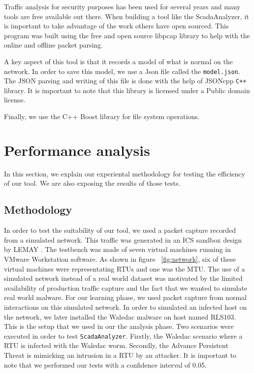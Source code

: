 \documentclass[12pt,journal,compsoc]{IEEEtran}
\begin{document}
\begin{empfile}
Traffic analysis for security purposes has been used for several years and many tools are free available out there. When building a tool like the ScadaAnalyzer, it is important to take advantage of the work others have open sourced. This program was built using the free and open source libpcap library to help with the online and offline packet parsing\cite{libpcap}. 

A key aspect of this tool is that it records a model of what is normal on the network. In order to save this model, we use a Json file called the \texttt{model.json}. The JSON parsing and writing of this file is done with the help of JSONcpp \verb!C++! library\cite{jsoncpp}. It is important to note that this library is licensed under a Public domain license.

Finally, we use the C++ Boost library for file system operations\cite{boost}.
\section{Performance analysis}
In this section, we explain our experiental methodology for testing the efficiency of our tool. We are also exposing the results of those tests.
\subsection{Methodology}
In order to test the suitability of our tool, we used a packet capture recorded from a simulated network. This traffic was generated in an ICS sandbox design by LEMAY \cite{lemay}. The testbench was made of seven virtual machines running in VMware Workstation software. As shown in figure ~\ref{fig:network}, six of these virtual machines were representating RTUs and one was the MTU. The use of a simulated network instead of a real world dataset was motivated by the limited availability of production traffic capture and the fact that we wanted to simulate real world malware. 
For our learning phase, we used packet capture from  normal interactions on this simulated network. In order to simulated an infected host on the network, we later installed the Waledac malware on host named RLS103. 
This is the setup that we used in our the analysis phase. Two scenarios were executed in order to test \texttt{ScadaAnalyzer}. Firstly, the Waledac scenario where a RTU is infected with the Waledac worm. Secondly, the Advance Persistent Threat is mimicking an intrusion in a RTU by an attacker.
It is important to note that we performed our tests with a confidence interval of 0.05.


\end{empfile}
\end{document}

